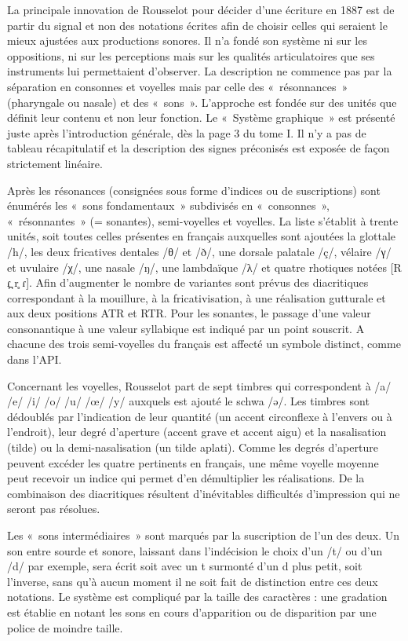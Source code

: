 \documentclass[output=paper]{langsci/langscibook}
\begin{document}
La principale innovation de Rousselot pour décider d’une écriture en 1887 est de partir du signal et non des notations écrites afin de choisir celles qui seraient le mieux ajustées aux productions sonores. Il n’a fondé son système ni sur les oppositions, ni sur les perceptions mais sur les qualités articulatoires que ses instruments lui permettaient d’observer. La description ne commence pas par la séparation en consonnes et voyelles mais par celle des «~résonnances~» (pharyngale ou nasale) et des «~sons~». L’approche est fondée sur des unités que définit leur contenu et non leur fonction. Le «~Système graphique~» est présenté juste après l’introduction générale, dès la page 3 du tome I. Il n’y a pas de tableau récapitulatif et la description des signes préconisés est exposée de façon strictement linéaire.

Après les résonances (consignées sous forme d’indices ou de suscriptions) sont énumérés les «~sons fondamentaux~» subdivisés en «~consonnes~», «~résonnantes~» (= sonantes), semi-voyelles et voyelles. La liste s’établit à trente unités, soit toutes celles présentes en français auxquelles sont ajoutées la glottale /h/, les deux fricatives dentales /θ/ et /ð/, une dorsale palatale /ç/, vélaire /γ/ et uvulaire /χ/, une nasale /ŋ/, une lambdaïque /λ/ et quatre rhotiques notées [R \textlatin{ɾ}\textlatin{̪} r\textlatin{̥} \textlatin{ɾ}]. Afin d’augmenter le nombre de variantes sont prévus des diacritiques correspondant à la mouillure, à la fricativisation, à une réalisation gutturale et aux deux positions ATR et RTR. Pour les sonantes, le passage d’une valeur consonantique à une valeur syllabique est indiqué par un point souscrit. A chacune des trois semi-voyelles du français est affecté un symbole distinct, comme dans l’API.

Concernant les voyelles, Rousselot part de sept timbres qui correspondent à /a/ /e/ /i/ /o/ /u/ /œ/ /y/ auxquels est ajouté le schwa /\textlatin{ə}/. Les timbres sont dédoublés par l’indication de leur quantité (un accent circonflexe à l’envers ou à l’endroit), leur degré d’aperture (accent grave et accent aigu) et la nasalisation (tilde) ou la demi-nasalisation (un tilde aplati). Comme les degrés d’aperture peuvent excéder les quatre pertinents en français, une même voyelle moyenne peut recevoir un indice qui permet d’en démultiplier les réalisations. De la combinaison des diacritiques résultent d’inévitables difficultés d’impression qui ne seront pas résolues.

Les «~sons intermédiaires~» sont marqués par la suscription de l’un des deux. Un son entre sourde et sonore, laissant dans l’indécision le choix d’un /t/ ou d’un /d/ par exemple, sera écrit soit avec un t surmonté d’un d plus petit, soit l’inverse, sans qu’à aucun moment il ne soit fait de distinction entre ces deux notations. Le système est compliqué par la taille des caractères : une gradation est établie en notant les sons en cours d’apparition ou de disparition par une police de moindre taille.
\end{document}
